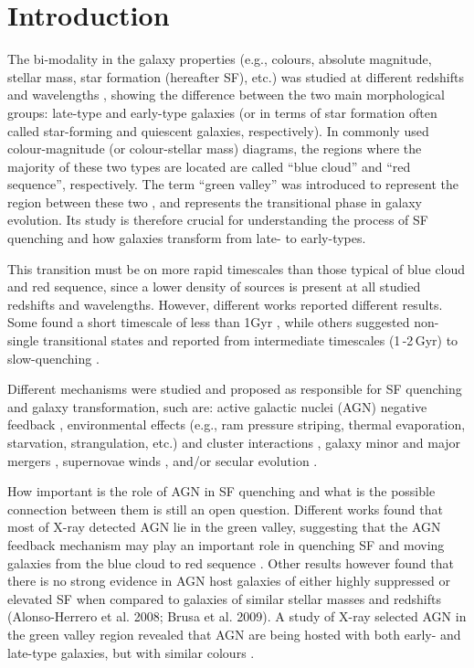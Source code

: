 \documentclass[fleqn,usenatbib]{mnras}
\begin{document}
\section{Introduction}
The bi-modality in the galaxy properties (e.g., colours, absolute magnitude, stellar mass, star formation (hereafter SF), etc.) was studied at different redshifts and wavelengths \citep[e.g.][]{kauffmann03, baldry04, salim07, brammer09, povic13, walker13, Lee}, showing the difference between the two main morphological groups: late-type and early-type galaxies (or in terms of star formation often called star-forming and quiescent galaxies, respectively). In commonly used colour-magnitude (or colour-stellar mass) diagrams, the regions where the majority of these two types are located are called ``blue cloud'' and ``red sequence'', respectively. The term ``green valley'' was introduced to represent the region between these two \citep{martin05}, and represents the transitional phase in galaxy evolution. Its study is therefore crucial for understanding the process of SF quenching and how galaxies transform from late- to early-types.    

This transition must be on more rapid timescales than those typical of blue cloud and red sequence, since a lower density of sources is present at all studied redshifts and wavelengths. However, different works reported different results. Some found a short timescale of less than 1Gyr \citep{faber07, Pan}, while others suggested non-single transitional states and reported from intermediate timescales (1\,-2\,Gyr) to slow-quenching \citep{Schawinski, Smethurst}.

Different mechanisms were studied and proposed as responsible for SF quenching and galaxy transformation, such are: active galactic nuclei (AGN) negative feedback \citep[e.g.][]{dimatteo05, Nandra}, environmental effects (e.g., ram pressure striping, thermal evaporation, starvation, strangulation, etc.) and cluster interactions \citep{gunn72, cowie77, larson80, bekki02,fang13}, galaxy minor and major mergers \citep[][and references therein]{barro13, Smethurst}, supernovae winds \citep[][and references therein]{marasco12}, and/or secular evolution \citep{mendez11, Smethurst}. 

How important is the role of AGN in SF quenching and what is the possible connection between them is still an open question. Different works found that most of X-ray detected AGN lie in the green valley, suggesting that the AGN feedback mechanism may play an important role in quenching SF and moving galaxies from the blue cloud to red sequence \citep{Sanchez2004, Nandra, Georgakakis2008, Silverman2008, Treister, Povi2, Povi}. Other results however found that there is no strong evidence in AGN host galaxies of either highly suppressed or elevated SF when compared to galaxies of similar stellar masses and redshifts (Alonso-Herrero et al. 2008; Brusa et al. 2009). A study of X-ray selected AGN in the green valley region revealed that AGN are being hosted with both early- and late-type galaxies, but with similar colours \citep{Povi2, Povi}. 
\end{document}
